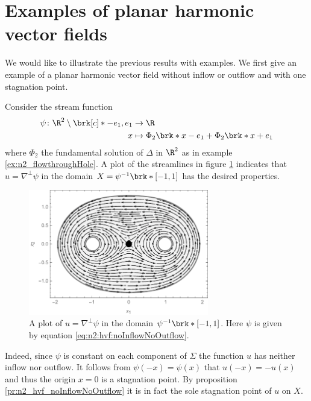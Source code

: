 \section{Examples of planar harmonic vector fields}

We would like to illustrate the previous results with examples.
We first give an example of a planar harmonic vector field without 
inflow or outflow and with one stagnation point.
\begin{example}[No in- or outflow]
  Consider the stream function
  \begin{equation}
    \begin{aligned}
    \psi\colon\R^2\setminus\brk[c]*{-e_1,e_1}&\to\R \\
    x&\mapsto\Phi_2\brk*{x-e_1}+\Phi_2\brk*{x+e_1}
    \end{aligned}\label{eq:n2:hvf:noInflowNoOutflow}
  \end{equation}
  where $\Phi_2$ the fundamental solution of $\Delta$ in $\R^2$ as in example \ref{ex:n2_flowthroughHole}.
  A plot of the streamlines in figure \ref{pl:n2_hvf_noInflowNoOutflow}
  indicates that $u=\nabla^\perp\psi$
  in the domain $X=\psi^{-1}\brk*{[-1,1]}$ has the desired properties.
  \begin{figure}
    \centering
    \includegraphics[width=0.7\textwidth]{../Plots/n2_hvf_noInflowNoOutflow_symmetric_gray_2.pdf}
    \caption{A plot of $u=\nabla^\perp\psi$ in the domain $\psi^{-1}\brk*{[-1,1]}$.
      Here $\psi$ is given by equation \eqref{eq:n2:hvf:noInflowNoOutflow}.}
    \label{pl:n2_hvf_noInflowNoOutflow}
  \end{figure}
  Indeed, since $\psi$ is constant on each component of $\Sigma$ the function $u$ has 
  neither inflow nor outflow.
  It follows from $\psi(-x)=\psi(x)$ that $u(-x)=-u(x)$ 
  and thus the origin $x=0$ is a stagnation point.
  By proposition \ref{pr:n2_hvf_noInflowNoOutflow} it is in fact the
  sole stagnation point of $u$ on $X$.
\end{example}

